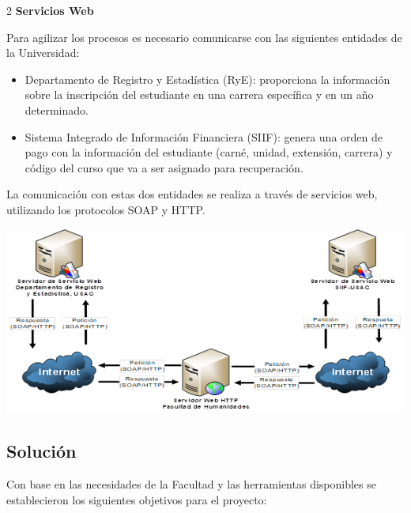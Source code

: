 \documentclass[12pt,spanish,Letterpaper,openany]{book}
\newcommand{\spacesixmilis}{\vspace{6mm}}
\newcommand{\spacetwomilis}{\vspace{2mm}}
\newcommand{\spacetwominus}{\vspace{-2mm}}
\begin{document}
\begin {multicols}{2}
\textbf{Servicios Web}

Para agilizar los procesos es necesario comunicarse con las siguientes entidades de la Universidad:

\begin{itemize}
\item
  Departamento de Registro y Estadística (RyE): proporciona la información sobre la inscripción del estudiante en una carrera específica y en un año determinado.
\item
  Sistema Integrado de Información Financiera (SIIF): genera una orden de pago con la información del estudiante (carné, unidad, extensión, carrera) y código del curso que va a ser asignado para recuperación.
\end{itemize}

La comunicación con estas dos entidades se realiza a través de servicios web, utilizando los protocolos SOAP y HTTP.

\spacetwomilis
\spacesixmilis

\begin {flushleft}
\noindent\begin{minipage}[c]{\columnwidth}

\includegraphics[width=1\linewidth]{images/image03_rherrera}

\end{minipage}

\end {flushleft}

\hypertarget{solucion}{%
\subsection{Solución}\label{solucion}}

\spacetwominus

Con base en las necesidades de la Facultad y las herramientas disponibles se establecieron los siguientes objetivos para el proyecto:


\end{multicols}
\end{document}

